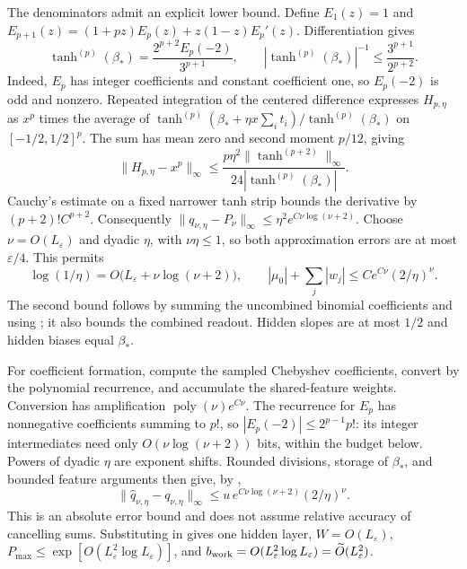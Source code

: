 The denominators admit an explicit lower bound. Define
$E_1(z)=1$ and $E_{p+1}(z)=(1+pz)E_p(z)+z(1-z)E_p'(z)$.
Differentiation gives
\begin{equation}
 \tanh^{(p)}(\beta_*)=\frac{2^{p+2}E_p(-2)}{3^{p+1}},
 \qquad |\tanh^{(p)}(\beta_*)|^{-1}\le\frac{3^{p+1}}{2^{p+2}}.
 \label{eq:cmp-mhaskar-denominator}
\end{equation}
Indeed, $E_p$ has integer coefficients and constant coefficient one, so
$E_p(-2)$ is odd and nonzero. Repeated integration of the centered difference
expresses $H_{p,\eta}$ as $x^p$ times the average of
$\tanh^{(p)}(\beta_*+\eta x\sum_i t_i)/\tanh^{(p)}(\beta_*)$ on
$[-1/2,1/2]^p$. The sum has mean zero and second moment $p/12$, giving
\begin{equation}
 \|H_{p,\eta}-x^p\|_\infty
 \le\frac{p\eta^2\|\tanh^{(p+2)}\|_\infty}
          {24|\tanh^{(p)}(\beta_*)|}.
 \label{eq:cmp-mhaskar-difference}
\end{equation}
Cauchy's estimate on a fixed narrower tanh strip bounds the derivative by
$(p+2)!C^{p+2}$. Consequently
$\|q_{\nu,\eta}-P_\nu\|_\infty\le\eta^2e^{C\nu\log(\nu+2)}$.
Choose $\nu=O(L_\varepsilon)$ and dyadic $\eta$, with $\nu\eta\le1$,
so both approximation errors are at most $\varepsilon/4$. This permits
\begin{equation}
 \log(1/\eta)=O\!\bigl(L_\varepsilon+\nu\log(\nu+2)\bigr),
 \qquad |\mu_0|+\sum_j|w_j|\le Ce^{C\nu}(2/\eta)^\nu.
 \label{eq:cmp-mhaskar-scales}
\end{equation}
The second bound follows by summing the uncombined binomial coefficients and
using ; it also bounds the combined readout.
Hidden slopes are at most $1/2$ and hidden biases equal $\beta_*$.

For coefficient formation, compute the sampled Chebyshev coefficients,
convert by the polynomial recurrence, and accumulate the shared-feature
weights. Conversion has amplification $\operatorname{poly}(\nu)e^{C\nu}$.
The recurrence for $E_p$ has nonnegative coefficients summing to $p!$, so
$|E_p(-2)|\le2^{p-1}p!$: its integer intermediates need only
$O(\nu\log(\nu+2))$ bits, within the budget below. Powers of dyadic $\eta$
are exponent shifts. Rounded divisions, storage of $\beta_*$, and bounded
feature arguments then give, by \cite[Chs.~2--4]{Higham2002},
\begin{equation}
 \|\widehat q_{\nu,\eta}-q_{\nu,\eta}\|_\infty
 \le u\,e^{C\nu\log(\nu+2)}(2/\eta)^\nu.
 \label{eq:cmp-mhaskar-arithmetic}
\end{equation}
This is an absolute error bound and does not assume relative accuracy of
cancelling sums. Substituting  in
 gives one hidden layer, $W=O(L_\varepsilon)$,
$P_{\max}\le\exp[O(L_\varepsilon^2\log L_\varepsilon)]$, and
$b_{\rm work}=O(L_\varepsilon^2\log L_\varepsilon)
=\widetilde O(L_\varepsilon^2)$.

